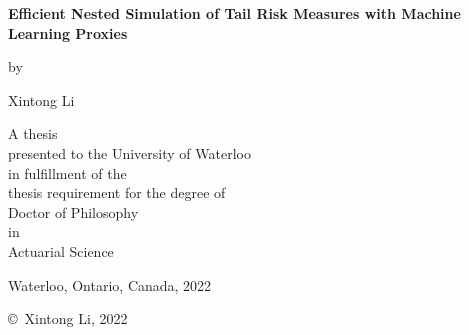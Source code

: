 \pagestyle{empty}

\begin{titlepage}
        \begin{center}
        \vspace*{1.0cm}

        \Huge
        {\bf Efficient Nested Simulation of Tail Risk Measures with Machine Learning Proxies }

        \vspace*{1.0cm}

        \normalsize
        by \\

        \vspace*{1.0cm}

        \Large
        Xintong Li \\

        \vspace*{3.0cm}

        \normalsize
        A thesis \\
        presented to the University of Waterloo \\ 
        in fulfillment of the \\
        thesis requirement for the degree of \\
        Doctor of Philosophy \\
        in \\
        Actuarial Science \\

        \vspace*{2.0cm}

        Waterloo, Ontario, Canada, 2022 \\

        \vspace*{1.0cm}

        \copyright\ Xintong Li, 2022 \\
        \end{center}
\end{titlepage}

\pagestyle{plain}
\setcounter{page}{2}

